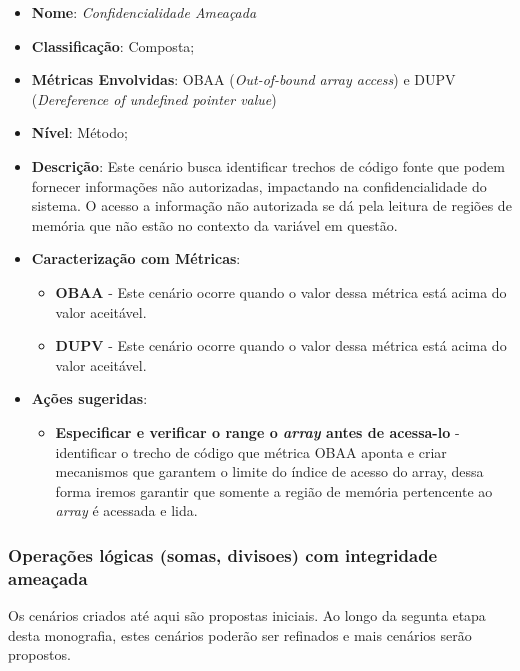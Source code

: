 \begin{itemize}
\item \textbf{Nome}: \emph{Confidencialidade Ameaçada}
\item \textbf{Classificação}: Composta;
\item \textbf{Métricas Envolvidas}: OBAA (\emph{Out-of-bound array access}) e DUPV (\emph{Dereference of undefined pointer value}) 
\item \textbf{Nível}: Método;
\item \textbf{Descrição}: Este cenário busca identificar trechos de código fonte que podem fornecer informações não autorizadas, impactando na confidencialidade do sistema. O acesso a informação não autorizada se dá pela leitura de regiões de memória que não estão no contexto da variável em questão.
\item \textbf{Caracterização com Métricas}: 
	\begin{itemize}
	\item \textbf{OBAA} - Este cenário ocorre quando o valor dessa métrica está acima do valor aceitável.
	\item \textbf{DUPV} - Este cenário ocorre quando o valor dessa métrica está acima do valor aceitável.
	\end{itemize}
\item \textbf{Ações sugeridas}: 
	\begin{itemize}
	\item \textbf{Especificar e verificar o range o \emph{array} antes de acessa-lo} - identificar o trecho de código que métrica OBAA aponta e criar mecanismos que garantem o limite do índice de acesso do array, dessa forma iremos garantir que somente a região de memória pertencente ao \emph{array} é acessada e lida.  
	 
	\end{itemize}
\end{itemize}


\subsubsection{Operações lógicas (somas, divisoes) com integridade ameaçada}



Os cenários criados até aqui são propostas iniciais. Ao longo da segunta etapa desta monografia, estes cenários poderão ser refinados e mais cenários serão propostos.

